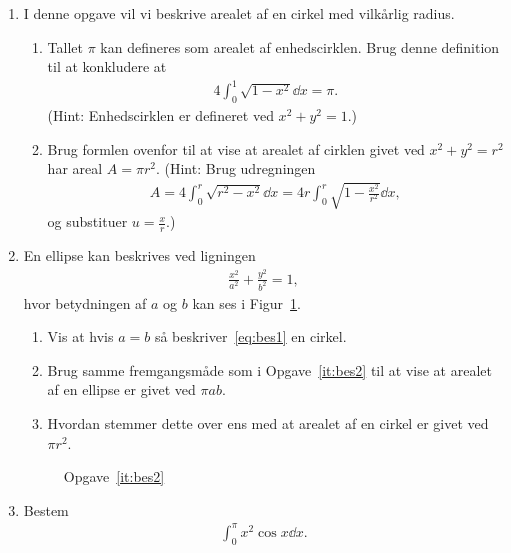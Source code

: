 \begin{enumerate}
	\item I denne opgave vil vi beskrive arealet af en cirkel med vilkårlig radius.
	\begin{enumerate}
		\item Tallet $\pi$ kan defineres som arealet af enhedscirklen. Brug denne definition til at konkludere at
		\begin{align*}
		4\int_0^1 \sqrt{1-x^2}\dd x=\pi.
		\end{align*}
		(Hint: Enhedscirklen er defineret ved $x^2+y^2=1$.)
		\item Brug formlen ovenfor til at vise at arealet af cirklen givet ved $x^2+y^2=r^2$ har areal $A=\pi r^2$.
		(Hint: Brug udregningen
		\begin{align*}
		A=4\int_0^r \sqrt{r^2-x^2}\dd x=4r\int_0^r \sqrt{1-\frac{x^2}{r^2}}\dd x,
		\end{align*}
		og substituer $u=\frac{x}{r}$.)
	\end{enumerate}
	\item\label{it:bes2} En ellipse kan beskrives ved ligningen 
	\begin{align}\label{eq:bes1}
	\frac{x^2}{a^2}+\frac{y^2}{b^2}=1,
	\end{align}
	 hvor betydningen af $a$ og $b$ kan ses i Figur~\ref{fig:bes2}.
			\begin{enumerate}
				\item Vis at hvis $a=b$ så beskriver~\eqref{eq:bes1} en cirkel. 
				\item Brug samme fremgangsmåde som i Opgave~\ref{it:bes2} til at vise at arealet af en ellipse er givet ved $\pi a b$.
				\item Hvordan stemmer dette over ens med at arealet af en cirkel er givet ved $\pi r^2$.
			\end{enumerate}

	\begin{figure}
	\centering
	\caption{Opgave~\ref{it:bes2}}
	\label{fig:bes2}
	\end{figure}
	\item Bestem
	\begin{align*}
	 \int_0^\pi x^2\cos x \dd x.
	\end{align*}
	

\end{enumerate}
